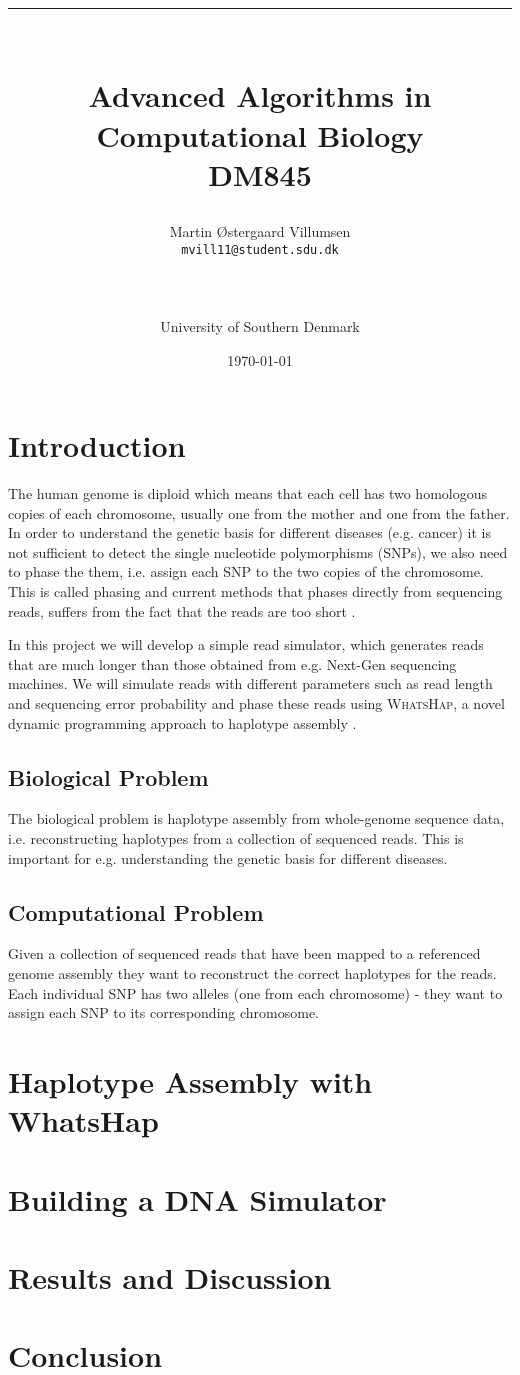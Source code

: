 \documentclass[10pt,a4paper]{article}
\title{\rule{12.5cm}{0.5mm}\\Advanced Algorithms in Computational Biology\\DM845}
\author{Martin Østergaard Villumsen\\\texttt{mvill11@student.sdu.dk}\\\rule{6.5cm}{0.5mm}\\University of Southern Denmark\\}
\date{\today}
\begin{document}
\maketitle


\section{Introduction}
The human genome is diploid which means that each cell has two homologous copies of each chromosome, usually one from the mother and one from the father. In order to understand the genetic basis for different diseases (e.g. cancer) it is not sufficient to detect the single nucleotide polymorphisms (SNPs), we also need to phase the them, i.e. assign each SNP to the two copies of the chromosome. This is called phasing and current methods that phases directly from sequencing reads, suffers from the fact that the reads are too short \cite{whatshap}.

In this project we will develop a simple read simulator, which generates reads that are much longer than those obtained from e.g. Next-Gen sequencing machines. We will simulate reads with different parameters such as read length and sequencing error probability and phase these reads using \textsc{WhatsHap}, a novel dynamic programming approach to haplotype assembly \cite{whatshap}.


\subsection{Biological Problem}
The biological problem is haplotype assembly from whole-genome sequence data, i.e. reconstructing haplotypes from a collection of sequenced reads. This is important for e.g. understanding the genetic basis for different diseases.
\subsection{Computational Problem}
Given a collection of sequenced reads that have been mapped to a referenced genome assembly they want to reconstruct the correct haplotypes for the reads. Each individual SNP has two alleles (one from each chromosome) - they want to assign each SNP to its corresponding chromosome.
\section{Haplotype Assembly with WhatsHap}
\section{Building a DNA Simulator}
\section{Results and Discussion}
\section{Conclusion}

{}

\end{document}
